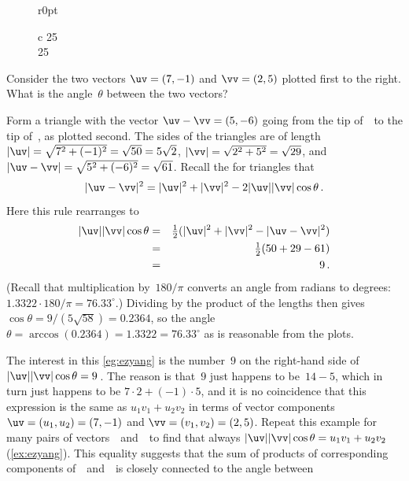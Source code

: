 {%
\def\vecopsHook{\node[above] at (axis cs:0,0) {$\qquad\theta$};}
\begin{figure}r{0pt}\begin{tabular}c
25\\25
\end{tabular}\end{figure}
\begin{example} \label{eg:ezyang}
Consider the two vectors \(\uv=(7,-1)\) and \(\vv=(2,5)\) plotted first to the right.
What is the angle~\(\theta\) between the two vectors?
\begin{solution} 
Form a triangle with the vector \(\uv-\vv=(5,-6)\) going from the tip of~\vv\ to the tip of~\uv, as plotted second.
The sides of the triangles are of length \(|\uv|=\sqrt{7^2+(-1)^2}=\sqrt{50}=5\sqrt2\), \(|\vv|=\sqrt{2^2+5^2}=\sqrt{29}\), and \(|\uv-\vv|=\sqrt{5^2+(-6)^2}=\sqrt{61}\).
Recall the  for triangles that
\begin{equation*}
|\uv-\vv|^2=|\uv|^2+|\vv|^2-2|\uv||\vv|\cos\theta \,.
\end{equation*}
Here this rule rearranges to
\begin{eqnarray*}
|\uv||\vv|\cos\theta
&=&\tfrac12(|\uv|^2+|\vv|^2-|\uv-\vv|^2)
\\&=&\tfrac12(50+29-61)
\\&=&9\,.
\end{eqnarray*}
(Recall that multiplication by~\(180/\pi\) converts an angle from radians to degrees: \(1.3322\cdot180/\pi=76.33^\circ\).)
Dividing by the product of the lengths then gives \(\cos\theta=9/(5\sqrt{58})=0.2364\), 
so the angle \(\theta =\arccos(0.2364) =1.3322 =76.33^\circ\) as is reasonable from the plots.
\end{solution}
\end{example}

The interest in this \cref{eg:ezyang} is the number~\(9\) on the right-hand side of \(|\uv||\vv|\cos\theta=9\)\,.  
The reason is that~\(9\) just happens to be~\(14-5\), which in turn just happens to be \(7\cdot2+(-1)\cdot5\), and it is no coincidence that this expression is the same as \(u_1v_1+u_2v_2\) in terms of vector components \(\uv=(u_1,u_2)=(7,-1)\) and \(\vv=(v_1,v_2)=(2,5)\).
Repeat this example for many pairs of vectors~\uv\ and~\vv\ to find that always \(|\uv||\vv|\cos\theta=u_1v_1+u_2v_2\) (\cref{ex:ezyang}).
This equality suggests that the sum of products of corresponding components of~\uv\ and~\vv\ is closely connected to the angle between 
}%


